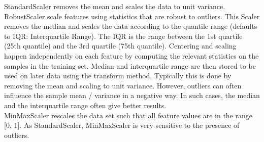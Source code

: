 \documentclass[english]{article}
\begin{document}
StandardScaler removes the mean and scales the data to unit variance.\\
RobustScaler scale features using statistics that are robust to outliers. This Scaler removes the median and scales the data according to the quantile range (defaults to IQR: Interquartile Range). The IQR is the range between the 1st quartile (25th quantile) and the 3rd quartile (75th quantile). Centering and scaling happen independently on each feature by computing the relevant statistics on the samples in the training set. Median and interquartile range are then stored to be used on later data using the transform method. Typically this is done by removing the mean and scaling to unit variance. However, outliers can often influence the sample mean / variance in a negative way. In such cases, the median and the interquartile range often give better results.\\
MinMaxScaler rescales the data set such that all feature values are in the range [0, 1].
As StandardScaler, MinMaxScaler is very sensitive to the presence of outliers.\\
\end{document}
